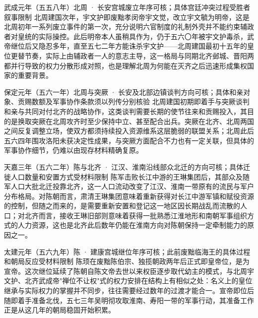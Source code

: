 \begin{event}{}{武成元年（五五八年）}{北周 · 长安宫城}{废立年序可核；具体宫廷冲突过程受胜者叙事限制}
北周建国次年，宇文护即废黜孝闵帝宇文觉，改立宇文毓为明帝，这是北周初年一系列废立事件的第一次，充分说明六官制度的礼制外壳并不能约束辅政者对皇统的实际操控。此后明帝本人虽稍具作为，仍于五六〇年被宇文护毒杀，武帝继位后又隐忍多年，直至五七二年方能诛杀宇文护——北周建国最初十五年的皇位更替节奏，实际上由辅政者一人的意志主导，这一格局与同期北齐邺城、晋阳两都并行导致的权力分散形成对照，也是理解北周为何能在灭齐之后迅速形成集权国家的重要背景。
\end{event}

\begin{event}{}{保定元年（五六一年）}{北周与突厥 · 长安及北部边镇}{谈判方向可核；具体和亲对象、贡赐数额及军事协作条款须以列传分别核验}
北周建国初期即着手与突厥谈判和亲与共同对付北齐的战略协作，这类谈判需要长期的使节往来和贡赐投入，其目的是换取突厥在北周攻齐时至少保持中立、甚至配合出兵。突厥在北齐、北周两国之间反复调整立场，使双方都须持续投入资源维系这层脆弱的联盟关系；北周此后五六四年围攻洛阳未获决定性成果，与突厥方面配合不力也有一定关联，但具体的军事协作细节，仍难以由现存材料精确复原。
\end{event}

\begin{event}{}{天嘉三年（五六二年）}{陈与北齐 · 江汉、淮南沿线}{部众北迁的方向可核；具体迁徙人口数量和安置方式受材料限制}
陈军击败长江中游的王琳集团后，其部众及随军人口大批北迁投靠北齐，这一人口流动改变了江汉、淮南一带原有的流民与军户分布格局。对陈朝而言，肃清王琳集团意味着重新获得对长江中游军镇和赋役资源的控制，但随之而来的，是需要重新安置和登记这一地区因长期战乱而流散的人口；对北齐而言，接收王琳旧部则意味着获得一批熟悉江淮地形和南朝军事组织方式的人力资源，这也是北齐此后数年仍能在淮南方向对陈朝保持一定牵制能力的原因之一。
\end{event}

\begin{event}{}{太建元年（五六九年）}{陈 · 建康宫城}{继位年序可核；此前废黜临海王的具体过程和朝局反应受材料限制}
陈顼在废黜陈伯宗、独揽朝政两年后正式即皇帝位，是为宣帝。这次继位延续了陈朝自陈文帝去世以来权臣逐步取代幼主的模式，与北周宇文护、北齐武成帝"禅位不让权"式的权力安排在结构上有相似之处：名义上的皇位继承与实际权力的掌握并不同步，往往需要经过数年的过渡才能合一。宣帝即位后随即着手准备北伐，五七三年吴明彻攻取淮南、寿阳一带的军事行动，其准备工作正是从这几年的朝局稳固开始积累。
\end{event}


